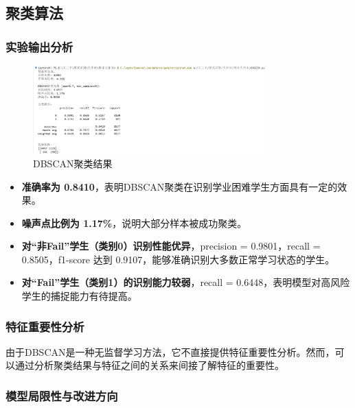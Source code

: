 \documentclass{SYSUReport}
\begin{document}
\subsection{聚类算法}

\subsubsection{实验输出分析}

\begin{figure}[htbp]
\centering
\includegraphics[width=0.8\textwidth]{figures/dbscan_result.png}
\caption{DBSCAN聚类结果}
\label{fig:dbscan_result}
\end{figure}

\begin{itemize}
\item \textbf{准确率为 0.8410}，表明DBSCAN聚类在识别学业困难学生方面具有一定的效果。
\item \textbf{噪声点比例为 1.17\%}，说明大部分样本被成功聚类。
\item \textbf{对“非Fail”学生（类别0）识别性能优异}，precision = 0.9801，recall = 0.8505，f1-score 达到 0.9107，能够准确识别大多数正常学习状态的学生。
\item \textbf{对“Fail”学生（类别1）的识别能力较弱}，recall = 0.6448，表明模型对高风险学生的捕捉能力有待提高。
\end{itemize}

\subsubsection{特征重要性分析}

由于DBSCAN是一种无监督学习方法，它不直接提供特征重要性分析。然而，可以通过分析聚类结果与特征之间的关系来间接了解特征的重要性。

\subsubsection{模型局限性与改进方向}
\end{document}
